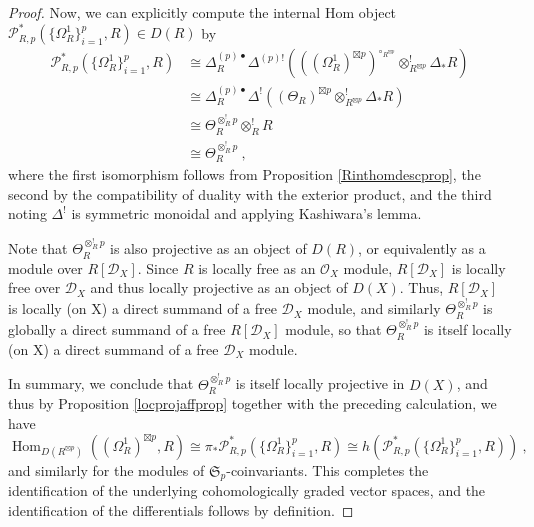 \documentclass[11pt]{amsart}
\numberwithin{equation}{section}
\theoremstyle{definition}
\newcommand{\mc}{\mathcal}
\newcommand{\mf}{\mathfrak}
\DeclareMathOperator{\Hom}{Hom}
\newcommand{\Ss}{{{\mf{S}}}}
\newcommand{\0}{{\textbf{0}}}
\newcommand{\DD}{{D}}
\def \mf{\mathfrak}
\begin{document}
\begin{proof}
	 Now, we can explicitly compute the internal Hom object $\mc P^*_{R,p}(\{\Omega^1_R\}_{i=1}^p,R)\in \DD(R)$ by
	 \begin{align*}
	 	\mc P^*_{R,p}(\{\Omega^1_R\}_{i=1}^p,R) & \cong \Delta_R^{(p)\bullet}\Delta^{(p)!}( \left((\Omega^1_R)^{\boxtimes p}\right)^{\circ_{R^{\boxtimes p}}} \otimes^!_{R^{\boxtimes p}} \Delta_* R) \\
	 	& \cong \Delta_R^{(p)\bullet}\Delta^!( (\Theta_R)^{\boxtimes p} \otimes^!_{R^{\boxtimes p}} \Delta_* R) \\
	 	& \cong \Theta_R^{\otimes^{!}_{R}p}\otimes^!_R R \\
	 	& \cong \Theta_R^{\otimes^{!}_{R}p} \ ,
	 \end{align*}
	 where the first isomorphism follows from Proposition \ref{Rinthomdescprop}, the second by the compatibility of duality with the exterior product, and the third noting $\Delta^!$ is symmetric monoidal and applying Kashiwara's lemma.
	 
Note that $\Theta_R^{\otimes^{!}_{R}p} $ is also projective as an object of $\DD(R)$, or equivalently as a module over $R[\mc D_X]$. Since $R$ is locally free as an $\mc O_X$ module, $R[\mc D_X]$ is locally free over $\mc D_X$ and thus locally projective as an object of $\DD(X)$. Thus, $R[\mc D_X]$ is locally (on X) a direct summand of a free $\mc D_X$ module, and similarly $\Theta_R^{\otimes^{!}_{R}p} $ is globally a direct summand of a free $R[\mc D_X]$ module, so that $\Theta_R^{\otimes^{!}_{R}p}$ is itself locally (on X) a direct summand of a free $\mc D_X$ module.
	 
	 In summary, we conclude that $\Theta_R^{\otimes^{!}_{R}p}$ is itself locally projective in $\DD(X)$, and thus by Proposition \ref{locprojaffprop} together with the preceding calculation, we have
	 \[\Hom_{\DD(R^{\boxtimes p})}((\Omega^1_R)^{\boxtimes p},R)  \cong  \pi_* \mc P^*_{R,p}(\{\Omega^1_R\}_{i=1}^p,R)  \cong h(\mc P^*_{R,p}(\{\Omega^1_R\}_{i=1}^p,R) ) \ , \]
	 and similarly for the modules of $\Ss_p$-coinvariants. This completes the identification of the underlying cohomologically graded vector spaces, and the identification of the differentials follows by definition.
\end{proof}
\end{document}
